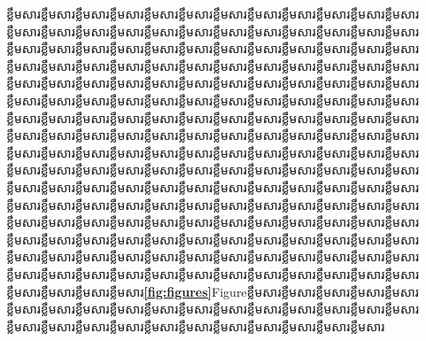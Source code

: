 \documentclass[a4paper,12pt,twoside]{book}
\theoremstyle{plain}
\theoremstyle{definition}
\theoremstyle{remark}
\begin{document}
ខ្លឹមសារខ្លឹមសារខ្លឹមសារខ្លឹមសារខ្លឹមសារខ្លឹមសារខ្លឹមសារខ្លឹមសារខ្លឹមសារខ្លឹមសារខ្លឹមសារខ្លឹមសារខ្លឹមសារខ្លឹមសារខ្លឹមសារខ្លឹមសារខ្លឹមសារខ្លឹមសារខ្លឹមសារខ្លឹមសារខ្លឹមសារខ្លឹមសារខ្លឹមសារខ្លឹមសារខ្លឹមសារខ្លឹមសារខ្លឹមសារខ្លឹមសារខ្លឹមសារខ្លឹមសារខ្លឹមសារខ្លឹមសារខ្លឹមសារខ្លឹមសារខ្លឹមសារខ្លឹមសារខ្លឹមសារខ្លឹមសារខ្លឹមសារខ្លឹមសារខ្លឹមសារខ្លឹមសារខ្លឹមសារខ្លឹមសារខ្លឹមសារខ្លឹមសារខ្លឹមសារខ្លឹមសារខ្លឹមសារខ្លឹមសារខ្លឹមសារខ្លឹមសារខ្លឹមសារខ្លឹមសារខ្លឹមសារខ្លឹមសារខ្លឹមសារខ្លឹមសារខ្លឹមសារខ្លឹមសារខ្លឹមសារខ្លឹមសារខ្លឹមសារខ្លឹមសារខ្លឹមសារខ្លឹមសារខ្លឹមសារខ្លឹមសារខ្លឹមសារខ្លឹមសារខ្លឹមសារខ្លឹមសារខ្លឹមសារខ្លឹមសារខ្លឹមសារខ្លឹមសារខ្លឹមសារខ្លឹមសារខ្លឹមសារខ្លឹមសារខ្លឹមសារខ្លឹមសារខ្លឹមសារខ្លឹមសារខ្លឹមសារខ្លឹមសារខ្លឹមសារខ្លឹមសារខ្លឹមសារខ្លឹមសារខ្លឹមសារខ្លឹមសារខ្លឹមសារខ្លឹមសារខ្លឹមសារខ្លឹមសារខ្លឹមសារខ្លឹមសារខ្លឹមសារខ្លឹមសារខ្លឹមសារខ្លឹមសារខ្លឹមសារខ្លឹមសារខ្លឹមសារខ្លឹមសារខ្លឹមសារខ្លឹមសារខ្លឹមសារខ្លឹមសារខ្លឹមសារខ្លឹមសារខ្លឹមសារខ្លឹមសារខ្លឹមសារខ្លឹមសារខ្លឹមសារខ្លឹមសារខ្លឹមសារខ្លឹមសារខ្លឹមសារខ្លឹមសារខ្លឹមសារខ្លឹមសារខ្លឹមសារខ្លឹមសារខ្លឹមសារខ្លឹមសារខ្លឹមសារខ្លឹមសារខ្លឹមសារខ្លឹមសារខ្លឹមសារខ្លឹមសារខ្លឹមសារខ្លឹមសារខ្លឹមសារខ្លឹមសារខ្លឹមសារខ្លឹមសារខ្លឹមសារខ្លឹមសារខ្លឹមសារខ្លឹមសារខ្លឹមសារខ្លឹមសារខ្លឹមសារខ្លឹមសារខ្លឹមសារខ្លឹមសារខ្លឹមសារខ្លឹមសារខ្លឹមសារខ្លឹមសារខ្លឹមសារខ្លឹមសារខ្លឹមសារខ្លឹមសារខ្លឹមសារខ្លឹមសារខ្លឹមសារខ្លឹមសារខ្លឹមសារខ្លឹមសារខ្លឹមសារខ្លឹមសារខ្លឹមសារខ្លឹមសារខ្លឹមសារខ្លឹមសារខ្លឹមសារខ្លឹមសារខ្លឹមសារខ្លឹមសារខ្លឹមសារខ្លឹមសារខ្លឹមសារខ្លឹមសារខ្លឹមសារខ្លឹមសារខ្លឹមសារខ្លឹមសារខ្លឹមសារខ្លឹមសារខ្លឹមសារខ្លឹមសារខ្លឹមសារខ្លឹមសារខ្លឹមសារខ្លឹមសារខ្លឹមសារខ្លឹមសារខ្លឹមសារខ្លឹមសារខ្លឹមសារខ្លឹមសារ{\textbf{\cref*{fig:figures}}}Figureខ្លឹមសារខ្លឹមសារខ្លឹមសារខ្លឹមសារខ្លឹមសារខ្លឹមសារខ្លឹមសារខ្លឹមសារខ្លឹមសារខ្លឹមសារខ្លឹមសារខ្លឹមសារខ្លឹមសារខ្លឹមសារខ្លឹមសារខ្លឹមសារខ្លឹមសារខ្លឹមសារខ្លឹមសារខ្លឹមសារខ្លឹមសារខ្លឹមសារខ្លឹមសារខ្លឹមសារខ្លឹមសារខ្លឹមសារខ្លឹមសារខ្លឹមសារ 
\end{document}
